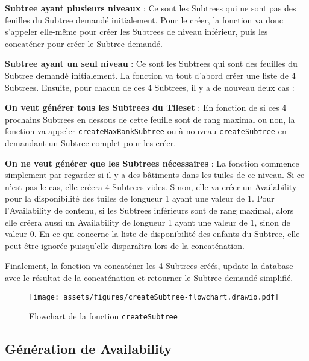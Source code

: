     \noindent\hspace*{\fill}\parbox{0.9\textwidth}{\textbf{Subtree ayant plusieurs niveaux} : Ce sont les Subtrees qui ne sont pas des feuilles du Subtree demandé initialement. Pour le créer, la fonction va donc s'appeler elle-même pour créer les Subtrees de niveau inférieur, puis les concaténer pour créer le Subtree demandé.
    }

    \noindent\hspace*{\fill}\parbox{0.9\textwidth}{\textbf{Subtree ayant un seul niveau} : Ce sont les Subtrees qui sont des feuilles du Subtree demandé initialement. La fonction va tout d'abord créer une liste de 4 Subtrees. Ensuite, pour chacun de ces 4 Subtrees, il y a de nouveau deux cas :
    }

        \noindent\hspace*{\fill}\parbox{0.8\textwidth}{\textbf{On veut générer tous les Subtrees du Tileset} : En fonction de si ces 4 prochains Subtrees en dessous de cette feuille sont de rang maximal ou non, la fonction va appeler \texttt{createMaxRankSubtree} ou à nouveau \texttt{createSubtree} en demandant un Subtree complet pour les créer.
        }

        \noindent\hspace*{\fill}\parbox{0.8\textwidth}{\textbf{On ne veut générer que les Subtrees nécessaires} : La fonction commence simplement par regarder si il y a des bâtiments dans les tuiles de ce niveau. Si ce n'est pas le cas, elle créera 4 Subtrees vides. Sinon, elle va créer un Availability pour la disponibilité des tuiles de longueur 1 ayant une valeur de 1. Pour l'Availability de contenu, si les Subtrees inférieurs sont de rang maximal, alors elle créera aussi un Availability de longueur 1 ayant une valeur de 1, sinon de valeur 0. En ce qui concerne la liste de disponibilité des enfants du Subtree, elle peut être ignorée puisqu'elle disparaîtra lors de la concaténation.
        }

    Finalement, la fonction va concaténer les 4 Subtrees créés, update la database avec le résultat de la concaténation et retourner le Subtree demandé simplifié.

\begin{figure}[H]
    \centering
    \texttt{[image: assets/figures/createSubtree-flowchart.drawio.pdf]}
    \caption{Flowchart de la fonction \texttt{createSubtree}}
    \label{fig:createsubtree-flowchart}
\end{figure}

\newpage
\subsection{Génération de Availability}
\label{sec:availability-gen}

